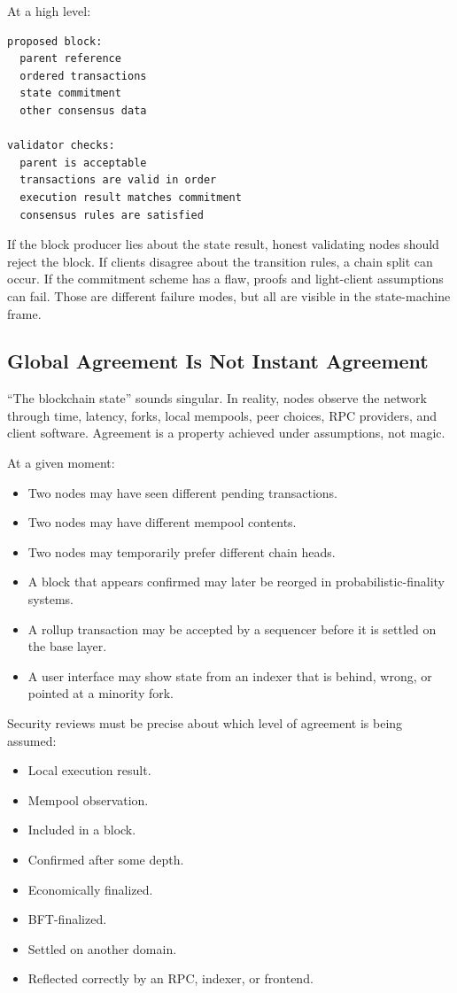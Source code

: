 At a high level:

\begin{lstlisting}
proposed block:
  parent reference
  ordered transactions
  state commitment
  other consensus data

validator checks:
  parent is acceptable
  transactions are valid in order
  execution result matches commitment
  consensus rules are satisfied
\end{lstlisting}

If the block producer lies about the state result, honest validating
nodes should reject the block. If clients disagree about the transition
rules, a chain split can occur. If the commitment scheme has a flaw,
proofs and light-client assumptions can fail. Those are different
failure modes, but all are visible in the state-machine frame.

\subsection{Global Agreement Is Not Instant Agreement}

``The blockchain state'' sounds singular. In reality, nodes observe the
network through time, latency, forks, local mempools, peer choices, RPC
providers, and client software. Agreement is a property achieved under
assumptions, not magic.

At a given moment:

\begin{itemize}
\tightlist
\item
  Two nodes may have seen different pending transactions.
\item
  Two nodes may have different mempool contents.
\item
  Two nodes may temporarily prefer different chain heads.
\item
  A block that appears confirmed may later be reorged in
  probabilistic-finality systems.
\item
  A rollup transaction may be accepted by a sequencer before it is
  settled on the base layer.
\item
  A user interface may show state from an indexer that is behind, wrong,
  or pointed at a minority fork.
\end{itemize}

Security reviews must be precise about which level of agreement is being
assumed:

\begin{itemize}
\tightlist
\item
  Local execution result.
\item
  Mempool observation.
\item
  Included in a block.
\item
  Confirmed after some depth.
\item
  Economically finalized.
\item
  BFT-finalized.
\item
  Settled on another domain.
\item
  Reflected correctly by an RPC, indexer, or frontend.
\end{itemize}

